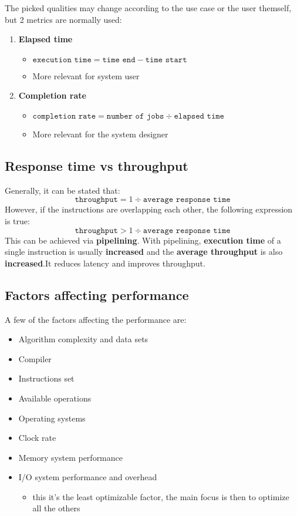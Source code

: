 \documentclass[english]{article}
\begin{document}
The picked qualities may change according to the use case or the user themself,
but 2 metrics are normally used:

\begin{enumerate}
  \item \textbf{Elapsed time}
        \begin{itemize}
          \item \(\texttt{execution time} = \texttt{time end} - \texttt{time start}\)
          \item More relevant for system user
        \end{itemize}
  \item \textbf{Completion rate}
        \begin{itemize}
          \item \(\texttt{completion rate} = \texttt{number of jobs} \div \texttt{elapsed time}\)
          \item More relevant for the system designer
        \end{itemize}
\end{enumerate}

\subsection{Response time vs throughput}

Generally, it can be stated that:
\[ \texttt{throughput} = {1} \div { \texttt{average response time}} \]
However, if the instructions are overlapping each other, the following expression is true:
\[ \texttt{throughput} > {1} \div {\texttt{average response time}} \]
This can be achieved via \textbf{pipelining}.
With pipelining, \textbf{execution time} of a single instruction is usually \textbf{increased} and  the \textbf{average throughput} is also \textbf{increased}.It reduces latency and improves throughput.

\subsection{Factors affecting performance}

A few of the factors affecting the performance are:

\begin{itemize}
  \item Algorithm complexity and data sets
  \item Compiler
  \item Instructions set
  \item Available operations
  \item Operating systems
  \item Clock rate
  \item Memory system performance
  \item I/O system performance and overhead
        \begin{itemize}
          \item this it's the least optimizable factor, the main focus is then to optimize all the others
        \end{itemize}
\end{itemize}
\end{document}
